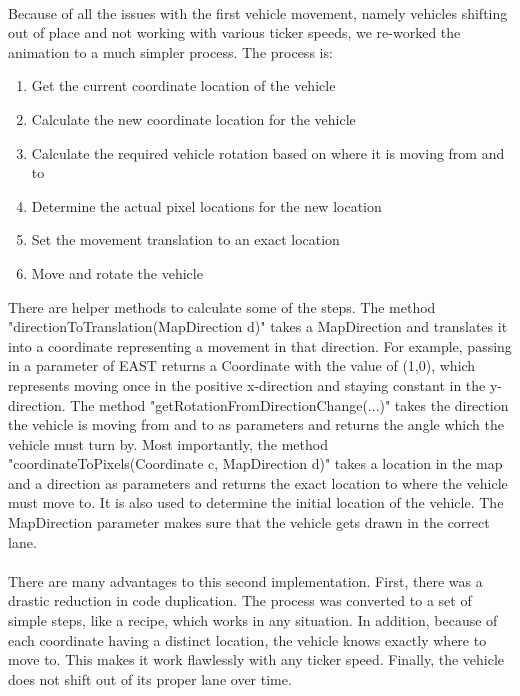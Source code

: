 \documentclass[a4paper,11pt,titlepage]{article}
\begin{document}
\paragraph{}
Because of all the issues with the first vehicle movement, namely vehicles shifting out of place and not working with various ticker speeds, we re-worked the animation to a much simpler process. The process is:
\begin{enumerate}\itemsep1pt \parskip0pt 
\item Get the current coordinate location of the vehicle
\item Calculate the new coordinate location for the vehicle
\item Calculate the required vehicle rotation based on where it is moving from and to
\item Determine the actual pixel locations for the new location
\item Set the movement translation to an exact location
\item Move and rotate the vehicle
\end{enumerate}
There are helper methods to calculate some of the steps. The method "directionToTranslation(MapDirection d)" takes a MapDirection and translates it into a coordinate representing a movement in that direction. For example, passing in a parameter of EAST returns a Coordinate with the value of (1,0), which represents moving once in the positive x-direction and staying constant in the y-direction. The method "getRotationFromDirectionChange(...)" takes the direction the vehicle is moving from and to as parameters and returns the angle which the vehicle must turn by. Most importantly, the method "coordinateToPixels(Coordinate c, MapDirection d)" takes a location in the map and a direction as parameters and returns the exact location to where the vehicle must move to. It is also used to determine the initial location of the vehicle. The MapDirection parameter makes sure that the vehicle gets drawn in the correct lane.

\paragraph{}
There are many advantages to this second implementation. First, there was a drastic reduction in code duplication. The process was converted to a set of simple steps, like a recipe, which works in any situation. In addition, because of each coordinate having a distinct location, the vehicle knows exactly where to move to. This makes it work flawlessly with any ticker speed. Finally, the vehicle does not shift out of its proper lane over time. 
\end{document}
